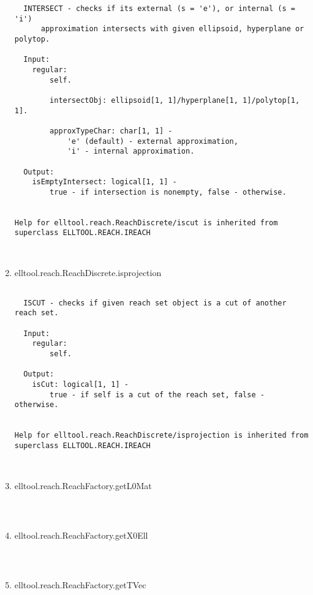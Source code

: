 \begin{enumerate}
\begin{lstlisting}
  INTERSECT - checks if its external (s = 'e'), or internal (s = 'i')
      approximation intersects with given ellipsoid, hyperplane or polytop.

  Input:
    regular:
        self.

        intersectObj: ellipsoid[1, 1]/hyperplane[1, 1]/polytop[1, 1].

        approxTypeChar: char[1, 1] -
            'e' (default) - external approximation,
            'i' - internal approximation.

  Output:
    isEmptyIntersect: logical[1, 1] -
        true - if intersection is nonempty, false - otherwise.


Help for elltool.reach.ReachDiscrete/iscut is inherited from superclass ELLTOOL.REACH.IREACH



\end{lstlisting}
\fontfamily{\familydefault}
\selectfont
\item {elltool.reach.ReachDiscrete.isprojection}
\selectfont
\begin{lstlisting}

  ISCUT - checks if given reach set object is a cut of another reach set.

  Input:
    regular:
        self.

  Output:
    isCut: logical[1, 1] -
        true - if self is a cut of the reach set, false - otherwise.


Help for elltool.reach.ReachDiscrete/isprojection is inherited from superclass ELLTOOL.REACH.IREACH



\end{lstlisting}
\fontfamily{\familydefault}
\selectfont
\item {elltool.reach.ReachFactory.getL0Mat}
\selectfont
\begin{lstlisting}



\end{lstlisting}
\fontfamily{\familydefault}
\selectfont
\item {elltool.reach.ReachFactory.getX0Ell}
\selectfont
\begin{lstlisting}



\end{lstlisting}
\fontfamily{\familydefault}
\selectfont
\item {elltool.reach.ReachFactory.getTVec}
\selectfont
\begin{lstlisting}




\end{lstlisting}
\end{enumerate}
